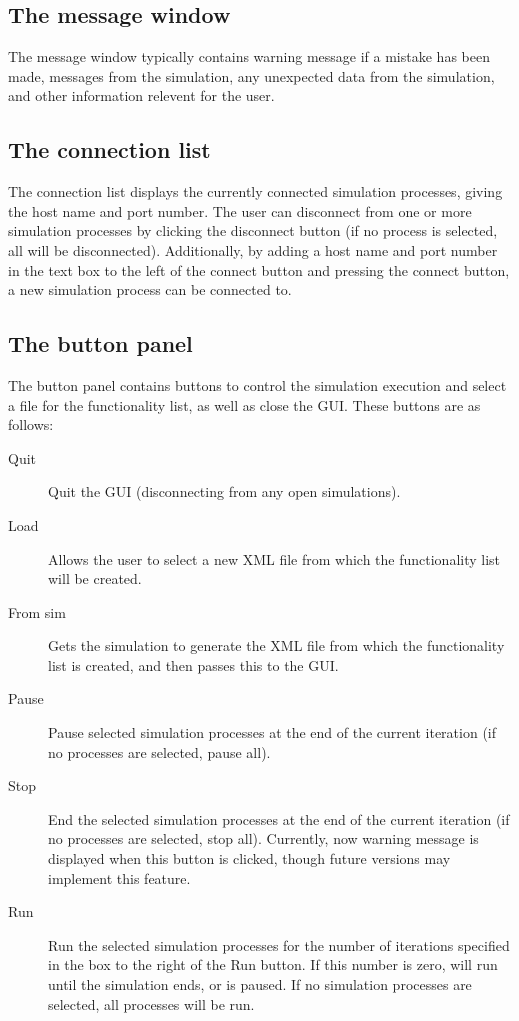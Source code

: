 \documentclass{article}
\begin{document}
\subsection{The message window}
The message window typically contains warning message if a mistake has
been made, messages from the simulation, any unexpected data from the
simulation, and other information relevent for the user.

\subsection{The connection list}
The connection list displays the currently connected simulation
processes, giving the host name and port number.  The user can
disconnect from one or more simulation processes by clicking the
disconnect button (if no process is selected, all will be
disconnected).  Additionally, by adding a host name and port number in
the text box to the left of the connect button and pressing the
connect button, a new simulation process can be connected to.

\subsection{The button panel}
The button panel contains buttons to control the simulation execution
and select a file for the functionality list, as well as close the
GUI.  These buttons are as follows:
\begin{description}
\item[Quit] Quit the GUI (disconnecting from any open simulations).
\item[Load] Allows the user to select a new XML file from which the
  functionality list will be created.
\item[From sim] Gets the simulation to generate the XML file from
  which the functionality list is created, and then passes this to the GUI.
\item[Pause] Pause selected simulation processes at the end of the current
  iteration (if no processes are selected, pause all).
\item[Stop] End the selected simulation processes at the end of the
  current iteration (if no processes are selected, stop all).
  Currently, now warning message is displayed when this button is
  clicked, though future versions may implement this feature.
\item[Run] Run the selected simulation processes for the number of
  iterations specified in the box to the right of the Run button.  If
  this number is zero, will run until the simulation ends, or is
  paused.  If no simulation processes are selected, all processes will
  be run.
\end{description}
\end{document}
